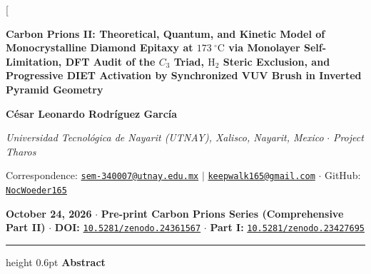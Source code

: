\documentclass[10pt,twocolumn,a4paper]{article}
\begin{document}
\twocolumn[
  \begin{@twocolumnfalse}
    \vspace{-0.65cm}
    {\centering
      {\Large \textbf{Carbon Prions II: Theoretical, Quantum, and Kinetic Model of Monocrystalline Diamond Epitaxy at $173\ ^\circ\text{C}$ via Monolayer Self-Limitation, DFT Audit of the $C_3$ Triad, $\text{H}_2$ Steric Exclusion, and Progressive DIET Activation by Synchronized VUV Brush in Inverted Pyramid Geometry} \par}
      \vspace{0.50em}
      {\normalsize \textbf{C\'esar Leonardo Rodr\'iguez Garc\'ia} \par}
      \vspace{0.18em}
      {\footnotesize \textit{Universidad Tecnol\'ogica de Nayarit (UTNAY), Xalisco, Nayarit, Mexico} $\cdot$ \textit{Project Tharos} \par}
      \vspace{0.15em}
      {\footnotesize Correspondence: \href{mailto:sem-340007@utnay.edu.mx}{\texttt{sem-340007@utnay.edu.mx}} $\mid$ \href{mailto:keepwalk165@gmail.com}{\texttt{keepwalk165@gmail.com}} $\cdot$ GitHub: \href{https://github.com/NocWoeder165}{\texttt{NocWoeder165}} \par}
      \vspace{0.18em}
      {\footnotesize \textbf{October 24, 2026} $\cdot$ \textbf{Pre-print Carbon Prions Series (Comprehensive Part II)} $\cdot$ \textbf{DOI:} \href{https://doi.org/10.5281/zenodo.24361567}{\texttt{10.5281/zenodo.24361567}} $\cdot$ \textbf{Part I:} \href{https://doi.org/10.5281/zenodo.23427695}{\texttt{10.5281/zenodo.23427695}} \par}
      \vspace{0.40em}
    }
    \hrule height 0.6pt
    \vspace{0.35em}
    \noindent\textbf{\normalsize Abstract}
    \vspace{0.20em}


\end{@twocolumnfalse}
\end{document}
